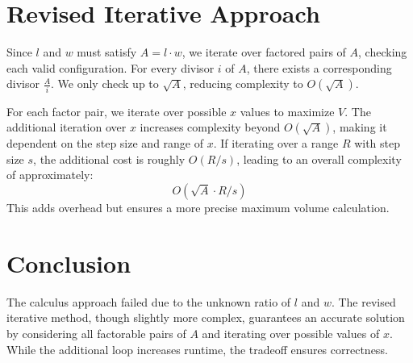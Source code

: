 \documentclass{article}
\begin{document}
\section{Revised Iterative Approach}
Since \( l \) and \( w \) must satisfy \( A = l \cdot w \), we iterate over factored pairs of \( A \), checking each valid configuration. For every divisor \( i \) of \( A \), there exists a corresponding divisor \( \frac{A}{i} \). We only check up to \( \sqrt{A} \), reducing complexity to \( O(\sqrt{A}) \).

For each factor pair, we iterate over possible \( x \) values to maximize \( V \). The additional iteration over \( x \) increases complexity beyond \( O(\sqrt{A}) \), making it dependent on the step size and range of \( x \). If iterating over a range \( R \) with step size \( s \), the additional cost is roughly \( O(R/s) \), leading to an overall complexity of approximately:
\begin{equation}
    O(\sqrt{A} \cdot R/s)
\end{equation}
This adds overhead but ensures a more precise maximum volume calculation.

\section{Conclusion}
The calculus approach failed due to the unknown ratio of \( l \) and \( w \). The revised iterative method, though slightly more complex, guarantees an accurate solution by considering all factorable pairs of \( A \) and iterating over possible values of \( x \). While the additional loop increases runtime, the tradeoff ensures correctness.
\end{document}
